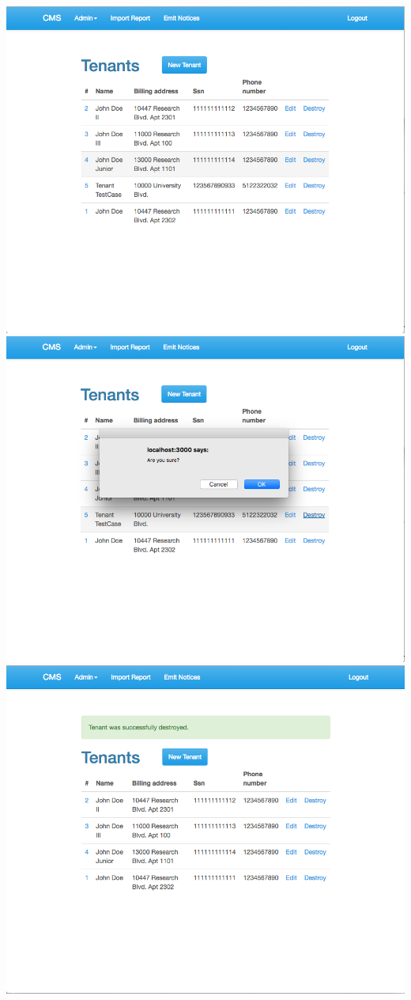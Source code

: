 \begin{itemize}
    \includegraphics[scale=0.25]{./images/ss/tenant/delete/2.png}\\
    \includegraphics[scale=0.25]{./images/ss/tenant/delete/3.png}
    \includegraphics[scale=0.25]{./images/ss/tenant/delete/4.png}
\end{itemize}
